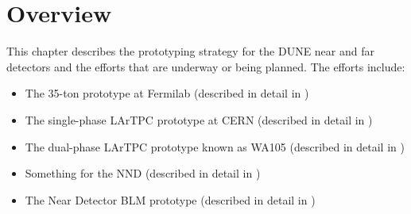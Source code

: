 \section{Overview}
\label{sec:proto-overview}


This chapter describes the prototyping strategy for the DUNE near and far detectors and the efforts that are underway or being planned.  The efforts include: 

\begin{itemize}
\item The 35-ton prototype at Fermilab (described in detail in \anxlbnefd)
\item The single-phase LArTPC prototype at CERN (described in detail in \anxcernproto)
\item The dual-phase LArTPC prototype known as WA105 (described in detail in \anxdualtdr)  
\item Something for the NND  (described in detail in ) 
\item The Near Detector BLM prototype (described in detail in ) 
\end{itemize}

